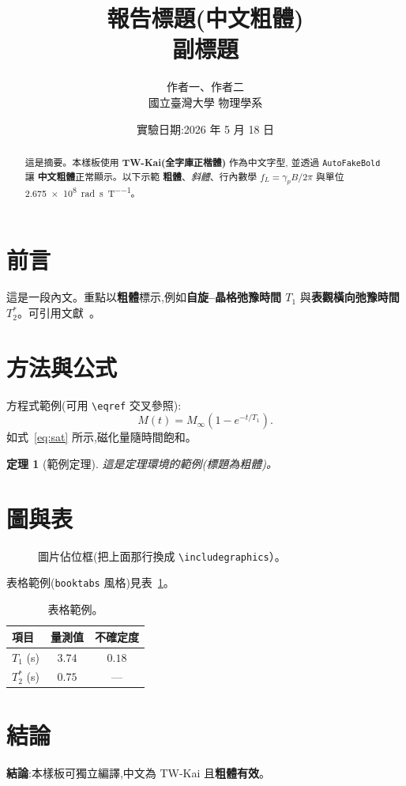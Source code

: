\documentclass[12pt,a4paper]{article}
\title{\bfseries 報告標題(中文粗體)\\[4pt]
       \large 副標題}
\author{作者一、作者二\\ \normalsize 國立臺灣大學 物理學系}
\date{實驗日期:2026 年 5 月 18 日}
\theoremstyle{mystyle}
\newtheorem{thm}{定理}
\begin{document}
\maketitle
\thispagestyle{fancy}

\begin{abstract}
\noindent 這是摘要。本樣板使用 \textbf{TW-Kai(全字庫正楷體)} 作為中文字型,
並透過 \texttt{AutoFakeBold} 讓 \textbf{中文粗體}正常顯示。以下示範
\textbf{粗體}、\emph{斜體}、行內數學 $f_L=\gamma_p B/2\pi$ 與單位
\SI{2.675e8}{\radian\per\second\per\tesla}。
\end{abstract}

\section{前言}
這是一段內文。重點以\textbf{粗體}標示,例如\textbf{自旋--晶格弛豫時間 $T_1$}
與\textbf{表觀橫向弛豫時間 $T_2^{*}$}。可引用文獻~\cite{Sample2024}。

\section{方法與公式}
方程式範例(可用 \texttt{\textbackslash eqref} 交叉參照):
\begin{equation}
M(t)=M_\infty\!\left(1-e^{-t/T_1}\right).
\label{eq:sat}
\end{equation}
如式~\eqref{eq:sat} 所示,磁化量隨時間飽和。

\begin{thm}[範例定理]
這是定理環境的範例(標題為粗體)。
\end{thm}

\section{圖與表}
\begin{figure}[htbp]
  \centering
  \fbox{\rule{0pt}{3cm}\rule{6cm}{0pt}}%
  \caption{圖片佔位框(把上面那行換成 \texttt{\textbackslash includegraphics}）。}
  \label{fig:demo}
\end{figure}

表格範例(\texttt{booktabs} 風格)見表~\ref{tab:demo}。
\begin{table}[htbp]
  \centering
  \caption{表格範例。}
  \label{tab:demo}
  \begin{tabular}{lcc}
    \toprule
    項目 & 量測值 & 不確定度 \\
    \midrule
    $T_1$ (s)     & $3.74$ & $0.18$ \\
    $T_2^{*}$ (s) & $0.75$ & ---    \\
    \bottomrule
  \end{tabular}
\end{table}

\section{結論}
\textbf{結論}:本樣板可獨立編譯,中文為 TW-Kai 且\textbf{粗體有效}。

\printbibliography
\end{document}
